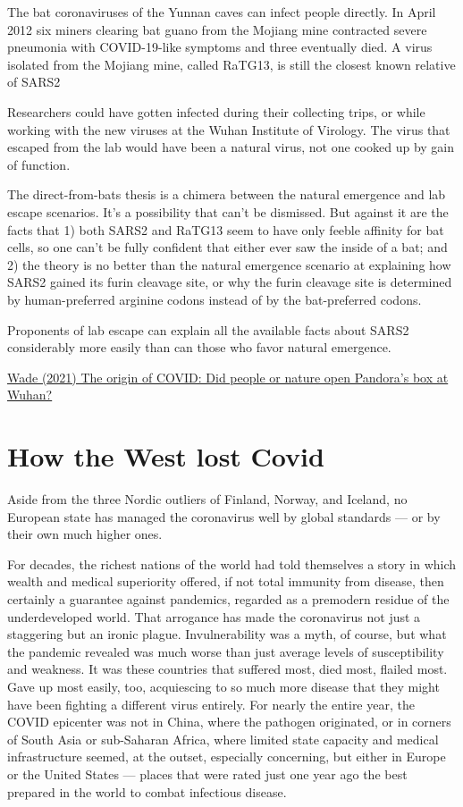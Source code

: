 \documentclass[
]{book}
\begin{document}
The bat coronaviruses of the Yunnan caves can infect people directly. In April 2012 six miners clearing bat guano from the Mojiang mine contracted severe pneumonia with COVID-19-like symptoms and three eventually died. A virus isolated from the Mojiang mine, called RaTG13, is still the closest known relative of SARS2

Researchers could have gotten infected during their collecting trips, or while working with the new viruses at the Wuhan Institute of Virology. The virus that escaped from the lab would have been a natural virus, not one cooked up by gain of function.

The direct-from-bats thesis is a chimera between the natural emergence and lab escape scenarios. It's a possibility that can't be dismissed. But against it are the facts that 1) both SARS2 and RaTG13 seem to have only feeble affinity for bat cells, so one can't be fully confident that either ever saw the inside of a bat; and 2) the theory is no better than the natural emergence scenario at explaining how SARS2 gained its furin cleavage site, or why the furin cleavage site is determined by human-preferred arginine codons instead of by the bat-preferred codons.

Proponents of lab escape can explain all the available facts about SARS2 considerably more easily than can those who favor natural emergence.

\href{https://thebulletin.org/2021/05/the-origin-of-covid-did-people-or-nature-open-pandoras-box-at-wuhan/}{Wade (2021) The origin of COVID: Did people or nature open Pandora's box at Wuhan?}

\hypertarget{how-the-west-lost-covid}{%
\section{How the West lost Covid}\label{how-the-west-lost-covid}}

Aside from the three Nordic outliers of Finland, Norway, and Iceland, no European state has managed the coronavirus well by global standards --- or by their own much higher ones.

For decades, the richest nations of the world had told themselves a story in which wealth and medical superiority offered, if not total immunity from disease, then certainly a guarantee against pandemics, regarded as a premodern residue of the underdeveloped world. That arrogance has made the coronavirus not just a staggering but an ironic plague. Invulnerability was a myth, of course, but what the pandemic revealed was much worse than just average levels of susceptibility and weakness. It was these countries that suffered most, died most, flailed most. Gave up most easily, too, acquiescing to so much more disease that they might have been fighting a different virus entirely. For nearly the entire year, the COVID epicenter was not in China, where the pathogen originated, or in corners of South Asia or sub-Saharan Africa, where limited state capacity and medical infrastructure seemed, at the outset, especially concerning, but either in Europe or the United States --- places that were rated just one year ago the best prepared in the world to combat infectious disease.
\end{document}
